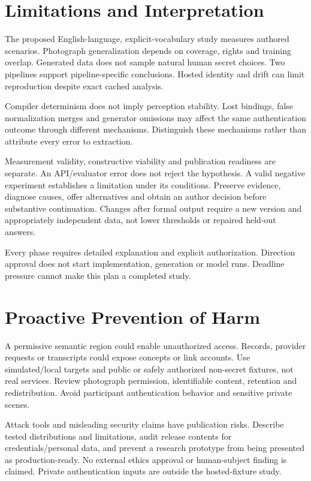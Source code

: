 \documentclass[compsoc,conference,a4paper,10pt,times]{IEEEtran}
\begin{document}
\section{Limitations and Interpretation}
\label{sec:limitations}
The proposed English-language, explicit-vocabulary study measures authored scenarios. Photograph generalization depends on coverage, rights and training overlap. Generated data does not sample natural human secret choices. Two pipelines support pipeline-specific conclusions. Hosted identity and drift can limit reproduction despite exact cached analysis.

Compiler determinism does not imply perception stability. Lost bindings, false normalization merges and generator omissions may affect the same authentication outcome through different mechanisms. Distinguish these mechanisms rather than attribute every error to extraction.

Measurement validity, constructive viability and publication readiness are separate. An API/evaluator error does not reject the hypothesis. A valid negative experiment establishes a limitation under its conditions. Preserve evidence, diagnose causes, offer alternatives and obtain an author decision before substantive continuation. Changes after formal output require a new version and appropriately independent data, not lower thresholds or repaired held-out answers.

Every phase requires detailed explanation and explicit authorization. Direction approval does not start implementation, generation or model runs. Deadline pressure cannot make this plan a completed study.

\section{Proactive Prevention of Harm}
\label{sec:harm}
A permissive semantic region could enable unauthorized access. Records, provider requests or transcripts could expose concepts or link accounts. Use simulated/local targets and public or safely authorized non-secret fixtures, not real services. Review photograph permission, identifiable content, retention and redistribution. Avoid participant authentication behavior and sensitive private scenes.

Attack tools and misleading security claims have publication risks. Describe tested distributions and limitations, audit release contents for credentials/personal data, and prevent a research prototype from being presented as production-ready. No external ethics approval or human-subject finding is claimed. Private authentication inputs are outside the hosted-fixture study.
\end{document}
